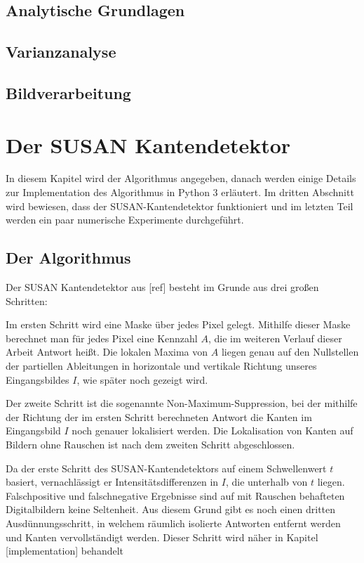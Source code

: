 \documentclass[a4paper, 11pt]{report}
\theoremstyle{definition}
\begin{document}
	\section{Analytische Grundlagen}
		

	\section{Varianzanalyse}
	\section{Bildverarbeitung}

\chapter{Der SUSAN Kantendetektor}
	In diesem Kapitel wird der Algorithmus angegeben, danach werden einige Details zur Implementation des Algorithmus in Python 3 erläutert. Im dritten Abschnitt wird bewiesen, dass der SUSAN-Kantendetektor funktioniert und im letzten Teil werden ein paar numerische Experimente durchgeführt.

	\section{Der Algorithmus}\label{sec:thealgorithm}
		Der SUSAN Kantendetektor aus [ref] besteht im Grunde aus drei großen Schritten:

		Im ersten Schritt wird eine Maske über jedes Pixel gelegt. Mithilfe dieser Maske berechnet man für jedes Pixel eine Kennzahl $A$, die im weiteren Verlauf dieser Arbeit \glqq Antwort\grqq{} heißt. Die lokalen Maxima von $A$ liegen genau auf den Nullstellen der partiellen Ableitungen in horizontale und vertikale Richtung unseres Eingangsbildes $I$, wie später noch gezeigt wird.

		Der zweite Schritt ist die sogenannte Non-Maximum-Suppression, bei der mithilfe der Richtung der im ersten Schritt berechneten Antwort die Kanten im Eingangsbild $I$ noch genauer lokalisiert werden. Die Lokalisation von Kanten auf Bildern ohne Rauschen ist nach dem zweiten Schritt abgeschlossen.

		Da der erste Schritt des SUSAN-Kantendetektors auf einem Schwellenwert $t$ basiert, vernachlässigt er Intensitätsdifferenzen in $I$, die unterhalb von $t$ liegen. Falschpositive und falschnegative Ergebnisse sind auf mit Rauschen behafteten Digitalbildern keine Seltenheit. Aus diesem Grund gibt es noch einen dritten Ausdünnungsschritt, in welchem räumlich isolierte Antworten entfernt werden und Kanten vervollständigt werden. Dieser Schritt wird näher in Kapitel [implementation] behandelt
\end{document}
